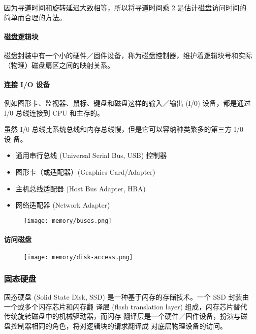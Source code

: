 因为寻道时间和旋转延迟大致相等，所以将寻道时间乘 2 是估计磁盘访问时间的简单而合理的方法。

\paragraph{磁盘逻辑块}

磁盘封装中有一个小的硬件／固件设备，称为磁盘控制器，维护着逻辑块号和实际（物理）磁盘扇区之间的映射关系。

\paragraph{连接 I/O 设备}

例如图形卡、监视器、鼠标、键盘和磁盘这样的输入／输出 (I/0) 设备，都是通过 I/0
总线连接到
CPU 和主存的。

虽然 I/0 总线比系统总线和内存总线慢，但是它可以容纳种类繁多的第三方 I/0 设
备。
\begin{itemize}
    \item 通用串行总线 (Universal Serial Bus, USB) 控制器
    \item 图形卡（或适配器）(Graphics Card/Adapter)
    \item 主机总线适配器 (Host Bus Adapter, HBA)
    \item 网络适配器 (Network Adapter)
\end{itemize}

\begin{figure}[H]
    \centering
    \texttt{[image: memory/buses.png]}
\end{figure}

\paragraph{访问磁盘}

\begin{figure}[H]
    \centering
    \texttt{[image: memory/disk-access.png]}
\end{figure}

\subsubsection{固态硬盘}

固态硬盘 (Solid State Disk, SSD) 是一种基于闪存的存储技术。一个 SSD 封装由一个或多个闪存芯片和闪存翻
译层 (flash translation layer) 组成，闪存芯片替代传统旋转磁盘中的机械驱动器，而闪存
翻译层是一个硬件／固件设备，扮演与磁盘控制器相同的角色，将对逻辑块的请求翻译成
对底层物理设备的访问。

